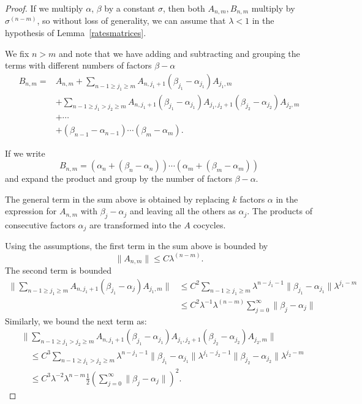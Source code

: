 \documentclass[11pt]{amsart}
\theoremstyle{definition}
\theoremstyle{remark}
\numberwithin{equation}{section}
\begin{document}
\begin{proof}
  If we multiply $\alpha$, $\beta$ by a constant $\sigma$, then both
  $A_{n,m},  B_{n,m}$ multiply by $\sigma^{(n-m)}$,  so without
  loss of generality, we can assume that $\lambda <1 $ in the
  hypothesis of Lemma~\ref{ratesmatrices}.


  We fix $n> m$ and
  note that we have adding and subtracting and  grouping the terms
  with different numbers of factors $\beta -\alpha$
  \[
  \begin{split}
    B_{n,m}= &A_{n,m} +
     \sum_{n-1\ge j_1\ge m}  A_{n, j_1+1} (\beta_{j_1} -  \alpha_{j_1}) A_{j_1, m}
     \\
     &+ \sum_{n-1\ge j_1> j_2\ge m} A_{n, j_1+1} (\beta_{j_1} -  \alpha_{j_1})
     A_{j_1, j_2+1}
  (\beta_{j_2} - \alpha_{j_2} ) A_{j_2, m} \\
  &+ \cdots \\
 & + (\beta_{n-1} - \alpha_{n-1}) \cdots (\beta_{m} - \alpha_{m}) .
  \end{split}
  \]

  If we write
  \[
  B_{n,m} = (\alpha_n + (\beta_n - \alpha_n) ) \cdots (\alpha_m + (\beta_m - \alpha_m) )
  \]
  and expand the product and group by the number of factors
  $\beta -\alpha$.

  The general term in the sum above is obtained by replacing $k$
  factors $\alpha$ in
  the expression for $A_{n,m}$
  with $\beta_j - \alpha_j$ and leaving all the others as $\alpha_j$.
  The products of consecutive factors $\alpha_j$ are
  transformed into the $A$ cocycles.

  Using the assumptions, the first term
  in the sum above is bounded by
  \[
  \| A_{n,m} \| \le C\lambda^{(n-m)} .
  \]
  The second term is bounded
  \[
  \begin{split}
\|  \sum_{n-1\ge j_1\ge m}  A_{n, {j_1}+1} (\beta_{j_1}-  \alpha_j) A_{{j_1}, m} \|
&\le C^2 \sum_{n-1\ge j_1\ge m}\lambda^{n-{j_1}-1} \| \beta_{j_1} -  \alpha_{j_1} \|  \lambda^{{j_1}-m} \\
&\le C^2 \lambda^{-1}  \lambda^{(n-m)} \sum_{j=0}^{\infty} \| \beta_{j} - \alpha_{j}\|
  \end{split}
  \]
  Similarly, we bound the next term
  as:
  \[
  \begin{split}
    &\| \sum_{n-1\ge j_1> j_2\ge m} A_{n, j_1+1} (\beta_{j_1} -  \alpha_{j_1}) A_{j_1, j_2+1}
(\beta_{j_2} - \alpha_{j_2} ) A_{j_2, m} \|\\&\quad \le
C^3  \sum_{n-1\ge j_1> j_2\ge m} \lambda^{n-j_1-1} \| \beta_{j_1} -  \alpha_{j_1}\|  \lambda^{j_1-j_2-1}
 \| \beta_{j_2} -  \alpha_{j_2}\|\lambda^{j_2- m }
 \\
&\quad \le C^3 \lambda^{-2}  \lambda^{n-m} \frac{1}{2}
 \left( \sum_{j=0}^{\infty} \| \beta_j - \alpha_j\| \right)^2 .
  \end{split}
  \]


\end{proof}
\end{document}
